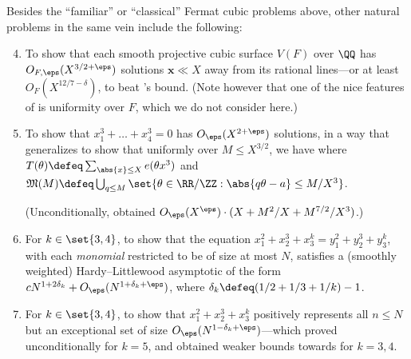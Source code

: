 \documentclass[12pt]{report}
\begin{document}
Besides the ``familiar'' or ``classical'' Fermat cubic problems above,
other natural problems in the same vein include the following:
\begin{enumerate}[(1)]
\setcounter{enumi}{3}
    \item To show that each smooth projective cubic surface $V(F)$ over $\QQ$ has $O_{F,\eps}(X^{3/2+\eps})$ solutions $\bm{x}\ll X$ away from its rational lines---or at least
    $O_F(X^{12/7-\delta})$,
    to beat \cite{salberger_2015}'s bound.
    (Note however that one of the nice features of \cite{salberger_2015} is uniformity over $F$,
    which we do not consider here.)
    
    \item To show that $x_1^3+\dots+x_4^3=0$ has $O_\eps(X^{2+\eps})$ solutions,
    in a way that generalizes
    to show that uniformly over $M\leq X^{3/2}$,
    we have
    where $T(\theta)\defeq
    \sum_{\abs{x}\leq X}
    e(\theta x^3)$
    and $\mathfrak{M}(M)\defeq
    \bigcup_{q\leq M}
    \set{\theta\in\RR/\ZZ
    : \abs{q\theta-a}\leq M/X^3}$.
    
    (Unconditionally,
    \cite{brudern1991ternary} obtained $O_\eps(X^\eps)\cdot (X+M^2/X+M^{7/2}/X^3)$.)
    
    \item For $k\in\set{3,4}$,
    to show that the equation
    $x_1^2+x_2^3+x_3^k = y_1^2+y_2^3+y_3^k$,
    with each \emph{monomial} restricted to be of size at most $N$,
    satisfies a
    (smoothly weighted)
    Hardy--Littlewood asymptotic of the form
    $cN^{1+2\delta_k} + O_\eps(N^{1+\delta_k+\eps})$,
    where $\delta_k\defeq
    (1/2+1/3+1/k)-1$.
    
    \item For $k\in\set{3,4}$,
    to show that
    $x_1^2+x_2^3+x_3^k$
    positively represents all $n\leq N$ but an exceptional set of size
    $O_\eps(N^{1-\delta_k+\eps})$---which \cite{brudern1991ternary}
    proved unconditionally for $k=5$,
    and obtained weaker bounds towards for $k=3,4$.
\end{enumerate}

\end{document}

